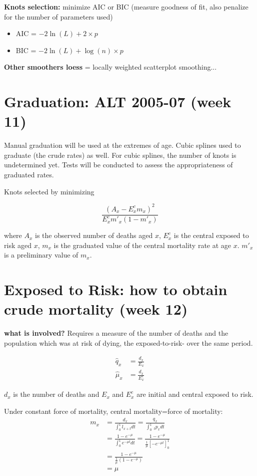 \documentclass[a4paper]{article}
\begin{document}
\textbf{Knots selection:} minimize AIC or BIC (measure goodness of fit, also penalize for the number of parameters used)
\begin{itemize}
	\item AIC = $-2\ln(L)+2\times p$
	\item BIC = $-2\ln(L)+\log(n)\times p$
\end{itemize}

\textbf{Other smoothers loess} = locally weighted scatterplot smoothing...

\section{Graduation: ALT 2005-07 (week 11)}

Manual graduation will be used at the extremes of age. Cubic splines used to graduate (the crude rates) as well. For cubic splines, the number of knots is undetermined yet. Tests will be conducted to assess the appropriateness of graduated rates.

Knots selected by minimizing

$$\frac{(A_x-E^c_xm_x)^2}{E^c_xm'_x(1-m'_x)}$$

where $A_x$ is the observed number of deaths aged $x$, $E^c_x$ is the central exposed to risk aged $x$, $m_x$ is the graduated value of the central mortality rate at age $x$. $m'_x$ is a preliminary value of $m_x$.

\section{Exposed to Risk: how to obtain crude mortality (week 12)}

\textbf{what is involved?} Requires a measure of the number of deaths and the population which was at risk of dying, the exposed-to-risk- over the same period.

\begin{equation}
	\begin{split}
		\hat{q}_x&=\frac{d_x}{E_x}\\
		\hat{\mu}_x&=\frac{d_x}{E^c_x}
	\end{split}
\end{equation}

$d_x$ is the number of deaths and $E_x$ and $E_x^c$ are initial and central exposed to risk.

Under constant force of mortality, central mortality=force of mortality:
\begin{equation}
	\begin{split}
		m_x&=\frac{d_x}{\int^1_0l_{x+t}dt}=\frac{q_x}{\int^1_0\ _tp_xdt}\\
		&=\frac{1-e^{-\mu}}{\int^1_0e^{-\mu t}dt}=\frac{1-e^{-\mu}}{\frac{1}{\mu}[-e^{-\mu t}]^1_0}\\
		&=\frac{1-e^{-\mu}}{\frac{1}{\mu}(1-e^{-\mu})}\\
		&=\mu
	\end{split}
\end{equation}
\end{document}
